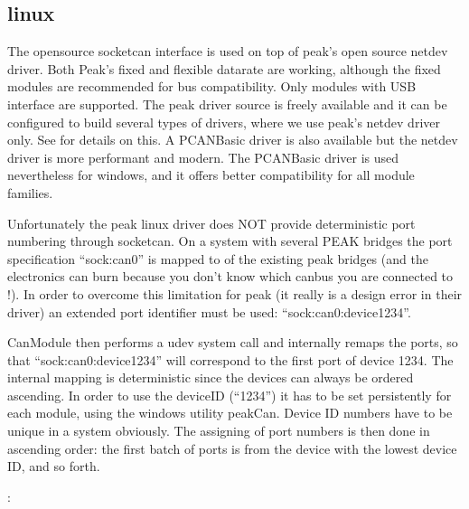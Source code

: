 \documentclass[a4paper,10pt,english]{sphinxmanual}
\begin{document}
\subsection{linux}
\label{\detokenize{vendors/peak:linux}}
The open\sphinxhyphen{}source socketcan interface is used on top of peak’s open source netdev driver. Both Peak’s
fixed and flexible datarate are working, although the fixed modules are recommended for bus compatibility.
Only modules with USB interface are supported.
The peak driver source is freely available and it can be configured to build several
types of drivers, where we use peak’s netdev driver only. See  for details on this.
A PCAN\sphinxhyphen{}Basic driver is also available but the netdev driver is more performant and modern. The
PCAN\sphinxhyphen{}Basic driver is used nevertheless for windows, and it offers better compatibility for all module
families.

Unfortunately the peak linux driver does NOT provide deterministic port numbering through socketcan. On a
system with several PEAK bridges the port specification “sock:can0” is mapped to 
of the existing peak bridges (and the electronics can burn because you don’t know which
can\sphinxhyphen{}bus you are connected to !). In order to overcome this limitation for peak
(it really is a design error in their driver) an extended port identifier must be used: “sock:can0:device1234”.

CanModule then performs a udev system call and internally remaps the ports, so that “sock:can0:device1234”
will correspond to the first port of device 1234. The internal mapping is deterministic since the devices
can always be ordered ascending.
In order to use the deviceID (“1234”) it has to be set persistently for each module, using the windows
utility peakCan. Device ID numbers have to be unique in a system obviously. The assigning of port numbers
is then done in ascending order: the first batch of ports is from the device with the lowest device ID,
and so forth.

:
\end{document}
